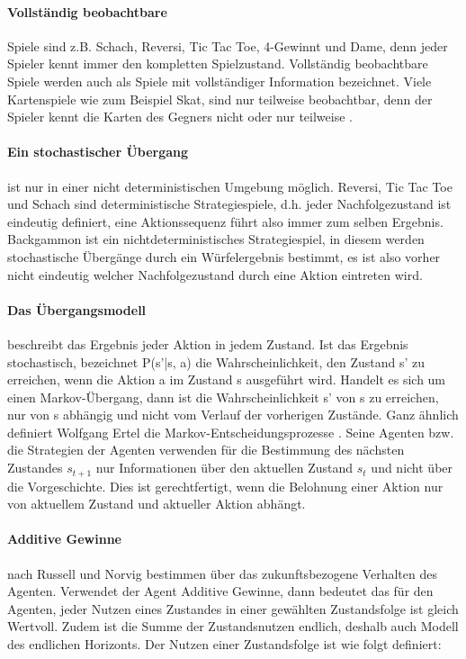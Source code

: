\paragraph{Vollständig beobachtbare} Spiele sind z.B. Schach, Reversi, Tic Tac Toe, 4-Gewinnt und Dame, denn jeder Spieler kennt immer den kompletten Spielzustand. Vollständig beobachtbare Spiele werden auch als Spiele mit vollständiger Information bezeichnet. Viele Kartenspiele wie zum Beispiel Skat, sind nur teilweise beobachtbar, denn der Spieler kennt die Karten des Gegners nicht oder nur teilweise \cite[114]{Ertel}.

\paragraph{Ein stochastischer Übergang} ist nur in einer nicht deterministischen Umgebung möglich. Reversi, Tic Tac Toe und Schach sind deterministische Strategiespiele, d.h. jeder Nachfolgezustand ist eindeutig definiert, eine Aktionssequenz führt also immer zum selben Ergebnis. Backgammon ist ein nichtdeterministisches Strategiespiel, in diesem werden stochastische Übergänge durch ein Würfelergebnis bestimmt, es ist also vorher nicht eindeutig welcher Nachfolgezustand durch eine Aktion eintreten wird.

\paragraph{Das Übergangsmodell} beschreibt das Ergebnis jeder Aktion in jedem Zustand. Ist das Ergebnis stochastisch, bezeichnet P(s'|s, a) die Wahrscheinlichkeit, den Zustand s' zu erreichen, wenn die Aktion a im Zustand s ausgeführt wird. Handelt es sich um einen Markov-Übergang, dann ist die Wahrscheinlichkeit s' von s zu erreichen, nur von s abhängig und nicht vom Verlauf der vorherigen Zustände. Ganz ähnlich definiert Wolfgang Ertel die Markov-Entscheidungsprozesse \cite[291]{Ertel}. Seine Agenten bzw. die Strategien der Agenten verwenden für die Bestimmung des nächsten Zustandes $s_{t+1}$ nur Informationen über den aktuellen Zustand $s_t$ und nicht über die Vorgeschichte. Dies ist gerechtfertigt, wenn die Belohnung einer Aktion nur von aktuellem Zustand und aktueller Aktion abhängt.

\paragraph{Additive Gewinne} nach Russell und Norvig \cite[756]{Russell} bestimmen über das zukunftsbezogene Verhalten des Agenten. Verwendet der Agent Additive Gewinne, dann bedeutet das für den Agenten, jeder Nutzen eines Zustandes in einer gewählten Zustandsfolge ist gleich Wertvoll. Zudem ist die Summe der Zustandsnutzen endlich, deshalb auch Modell des endlichen Horizonts. Der Nutzen einer Zustandsfolge ist wie folgt definiert: \\

